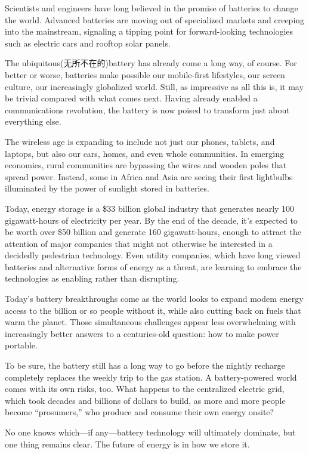 \documentclass[UTF8,11pt]{ctexart}
\begin{document}
Scientists and engineers have long believed in the promise of batteries to change the world. Advanced batteries are moving out of specialized markets and creeping into the mainstream, signaling a tipping point for forward-looking technologies such as electric cars and rooftop solar panels.


The ubiquitous(无所不在的)battery has already come a long way, of course. For better or worse, batteries make possible our mobile-first lifestyles, our screen culture, our increasingly globalized world. Still, as impressive as all this is, it may be trivial compared with what comes next. Having already enabled a communications revolution, the battery is now poised to transform just about everything else.


The wireless age is expanding to include not just our phones, tablets, and laptops, but also our cars, homes, and even whole communities. In emerging economies, rural communities are bypassing the wires and wooden poles that spread power. Instead, some in Africa and Asia are seeing their first lightbulbs illuminated by the power of sunlight stored in batteries.


Today, energy storage is a \$33 billion global industry that generates nearly 100 gigawatt-hours of electricity per year. By the end of the decade, it’s expected to be worth over \$50 billion and generate 160 gigawatt-hours, enough to attract the attention of major companies that might not otherwise be interested in a decidedly pedestrian technology. Even utility companies, which have long viewed batteries and alternative forms of energy as a threat, are learning to embrace the technologies as enabling rather than disrupting.


Today’s battery breakthroughs come as the world looks to expand modem energy access to the billion or so people without it, while also cutting back on fuels that warm the planet. Those simultaneous challenges appear less overwhelming with increasingly better answers to a centuries-old question: how to make power portable.


To be sure, the battery still has a long way to go before the nightly recharge completely replaces the weekly trip to the gas station. A battery-powered world comes with its own risks, too. What happens to the centralized electric grid, which took decades and billions of dollars to build, as more and more people become “prosumers,” who produce and consume their own energy onsite?


No one knows which---if any---battery technology will ultimately dominate, but one thing remains clear. The future of energy is in how we store it.
\end{document}
